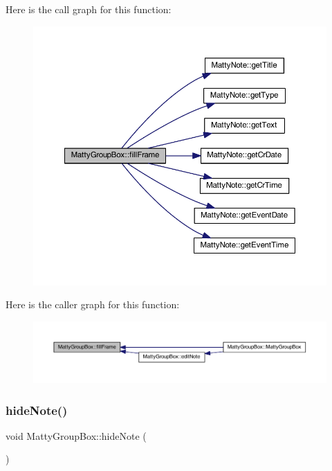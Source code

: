 Here is the call graph for this function\+:
\nopagebreak
\begin{figure}[H]
\begin{center}
\leavevmode
\includegraphics[width=350pt]{classMattyGroupBox_a982e84ed3ae5f61b542269e9b5e8ebba_cgraph}
\end{center}
\end{figure}
Here is the caller graph for this function\+:
\nopagebreak
\begin{figure}[H]
\begin{center}
\leavevmode
\includegraphics[width=350pt]{classMattyGroupBox_a982e84ed3ae5f61b542269e9b5e8ebba_icgraph}
\end{center}
\end{figure}
\hypertarget{classMattyGroupBox_ad96bd7663326b7b3e15c67455ccea32a}{}\label{classMattyGroupBox_ad96bd7663326b7b3e15c67455ccea32a} 
\subsubsection{\texorpdfstring{hide\+Note()}{hideNote()}}
{\footnotesize\ttfamily void Matty\+Group\+Box\+::hide\+Note (\begin{DoxyParamCaption}{ }\end{DoxyParamCaption})}



